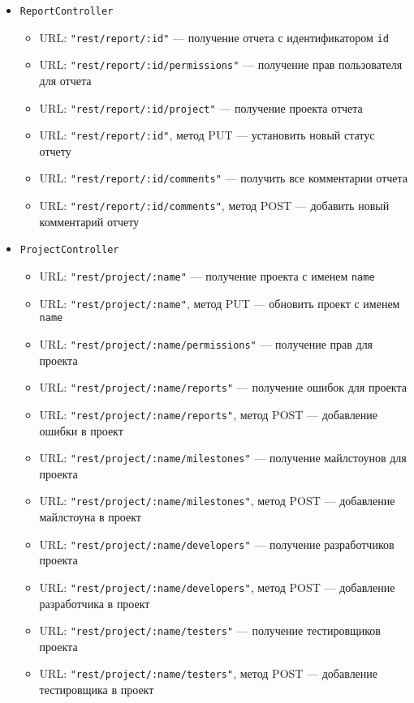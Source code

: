 \begin{itemize}
\item \texttt{ReportController}
	\begin{itemize}
	\item URL: \texttt{"rest/report/:id"} --- получение отчета с идентификатором \texttt{id}
	\item URL: \texttt{"rest/report/:id/permissions"} --- получение прав пользователя для отчета
	\item URL: \texttt{"rest/report/:id/project"} --- получение проекта отчета
	\item URL: \texttt{"rest/report/:id"}, метод PUT --- установить новый статус отчету
	\item URL: \texttt{"rest/report/:id/comments"} --- получить все комментарии отчета
	\item URL: \texttt{"rest/report/:id/comments"}, метод POST --- добавить новый комментарий отчету
	\end{itemize}
	
\item \texttt{ProjectController}
	\begin{itemize}
	\item URL: \texttt{"rest/project/:name"} --- получение проекта с именем \texttt{name}
	\item URL: \texttt{"rest/project/:name"}, метод PUT --- обновить проект с именем \texttt{name}
	\item URL: \texttt{"rest/project/:name/permissions"} --- получение прав для проекта
	\item URL: \texttt{"rest/project/:name/reports"} --- получение ошибок для проекта
	\item URL: \texttt{"rest/project/:name/reports"}, метод POST --- добавление ошибки в проект
	\item URL: \texttt{"rest/project/:name/milestones"} --- получение майлстоунов для проекта
	\item URL: \texttt{"rest/project/:name/milestones"}, метод POST --- добавление майлстоуна в проект
	\item URL: \texttt{"rest/project/:name/developers"} --- получение разработчиков проекта
	\item URL: \texttt{"rest/project/:name/developers"}, метод POST --- добавление разработчика в проект
	\item URL: \texttt{"rest/project/:name/testers"} --- получение тестировщиков проекта
	\item URL: \texttt{"rest/project/:name/testers"}, метод POST --- добавление тестировщика в проект
	\end{itemize}
	

\end{itemize}
